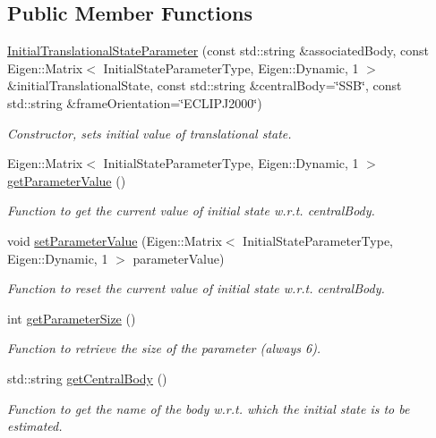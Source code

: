 \subsection*{Public Member Functions}
\begin{DoxyCompactItemize}
\item 
\hyperlink{classtudat_1_1estimatable__parameters_1_1InitialTranslationalStateParameter_acf9521e63317dfcec39505fc183685f7}{Initial\+Translational\+State\+Parameter} (const std\+::string \&associated\+Body, const Eigen\+::\+Matrix$<$ Initial\+State\+Parameter\+Type, Eigen\+::\+Dynamic, 1 $>$ \&initial\+Translational\+State, const std\+::string \&central\+Body=\char`\"{}S\+SB\char`\"{}, const std\+::string \&frame\+Orientation=\char`\"{}E\+C\+L\+I\+P\+J2000\char`\"{})
\begin{DoxyCompactList}\small\item\em Constructor, sets initial value of translational state. \end{DoxyCompactList}\item 
Eigen\+::\+Matrix$<$ Initial\+State\+Parameter\+Type, Eigen\+::\+Dynamic, 1 $>$ \hyperlink{classtudat_1_1estimatable__parameters_1_1InitialTranslationalStateParameter_a127b7255f01047b7e25b44ffa8a15870}{get\+Parameter\+Value} ()
\begin{DoxyCompactList}\small\item\em Function to get the current value of initial state w.\+r.\+t. central\+Body. \end{DoxyCompactList}\item 
void \hyperlink{classtudat_1_1estimatable__parameters_1_1InitialTranslationalStateParameter_a99775f766b178257618227c2f03d7d72}{set\+Parameter\+Value} (Eigen\+::\+Matrix$<$ Initial\+State\+Parameter\+Type, Eigen\+::\+Dynamic, 1 $>$ parameter\+Value)
\begin{DoxyCompactList}\small\item\em Function to reset the current value of initial state w.\+r.\+t. central\+Body. \end{DoxyCompactList}\item 
int \hyperlink{classtudat_1_1estimatable__parameters_1_1InitialTranslationalStateParameter_af5ed822fe6786c76b9d522ad37230fb1}{get\+Parameter\+Size} ()
\begin{DoxyCompactList}\small\item\em Function to retrieve the size of the parameter (always 6). \end{DoxyCompactList}\item 
std\+::string \hyperlink{classtudat_1_1estimatable__parameters_1_1InitialTranslationalStateParameter_ad48cafad51ed877bc215295ecd0b8319}{get\+Central\+Body} ()
\begin{DoxyCompactList}\small\item\em Function to get the name of the body w.\+r.\+t. which the initial state is to be estimated. \end{DoxyCompactList}\end{DoxyCompactItemize}
